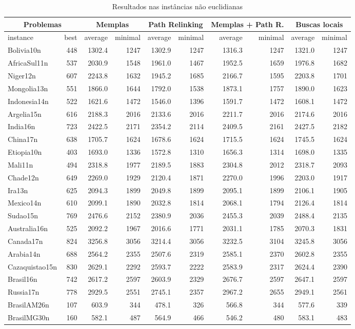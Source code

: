 \begin{landscape}
\begin{table}[htb]

\caption{Resultados nas instâncias não euclidianas}
\label{tab:resultadosNaoEuclidianas}
\begin{tabular}{@{}lr|rr|rr|rr|rr@{}}
\toprule
\multicolumn{2}{c}{Problemas}&\multicolumn{2}{c}{Memplas}&\multicolumn{2}{c}{Path Relinking}&\multicolumn{2}{c}{Memplas + Path R.}&\multicolumn{2}{c}{Buscas locais}\\\midrule
instance&best&average&minimal&average&minimal&average&minimal&average&minimal\\\midrule
Bolivia10n&448&1302.4&1247&1302.9&1247&1316.3&1247&1321.0&1247\\
AfricaSul11n&537&2030.9&1548&1961.0&1467&1952.5&1659&1976.8&1682\\
Niger12n&607&2243.8&1632&1945.2&1685&2166.7&1595&2203.8&1701\\
Mongolia13n&551&1866.0&1644&1792.0&1538&1873.1&1757&1890.0&1623\\
Indonesia14n&522&1621.6&1472&1546.0&1396&1591.7&1472&1608.1&1472\\
Argelia15n&616&2188.3&2016&2133.6&2016&2211.7&2016&2174.6&2016\\
India16n&723&2422.5&2171&2354.2&2114&2409.5&2161&2427.5&2182\\
China17n&638&1705.7&1624&1678.6&1624&1715.5&1624&1745.5&1624\\
Etiopia10n&403&1693.0&1336&1572.8&1310&1656.3&1314&1698.0&1335\\
Mali11n&494&2318.8&1977&2189.5&1883&2304.8&2012&2318.7&2093\\
Chade12n&649&2269.0&1929&2120.4&1871&2270.0&1996&2203.0&1917\\
Ira13n&625&2094.3&1899&2049.8&1899&2095.1&1899&2106.1&1905\\
Mexico14n&610&2099.1&1890&2032.8&1814&2068.1&1794&2126.4&1814\\
Sudao15n&769&2476.6&2152&2380.9&2036&2455.3&2039&2488.4&2135\\
Australia16n&525&2092.2&1967&2016.6&1771&2031.1&1785&2070.3&1831\\
Canada17n&824&3256.8&3056&3214.4&3056&3232.5&3104&3245.8&3056\\
Arabia14n&688&2564.2&2355&2507.6&2319&2585.1&2370&2602.8&2355\\
Cazaquistao15n&830&2629.1&2292&2593.7&2222&2583.9&2317&2624.4&2390\\
Brasil16n&742&2617.2&2597&2603.9&2329&2676.7&2597&2647.1&2597\\
Russia17n&778&2929.5&2551&2745.1&2357&2967.2&2655&2949.1&2561\\
BrasilAM26n&107&603.9&344&478.1&326&566.8&344&577.6&339\\
BrasilMG30n&160&582.1&487&564.9&466&546.2&480&583.1&483\\
\bottomrule
\end{tabular}
\end{table}
\end{landscape}
